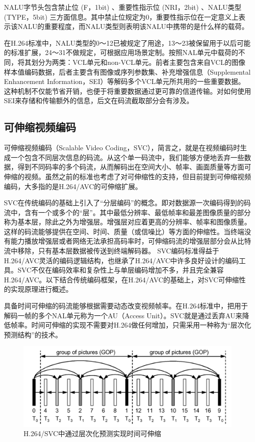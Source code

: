 NALU字节头包含禁止位 (F，1bit) 、重要性指示位 (NRI，2bit) 、NALU类型 (TYPE，5bit) 三方面信息。其中禁止位规定为0，重要性指示位在一定意义上表示该NALU的重要程度，而NALU类型则表明该NALU中携带的是什么样的载荷。

在H.264标准中，NALU类型的0～12已被规定了用途，13～23被保留用于以后可能的标准扩展，24～31不做规定，可根据应用场景定制。按照NAL单元中载荷的不同，将其划分为两类：VCL单元和non-VCL单元。前者主要包含来自VCL的图像样本值编码数据，后者主要含有图像或序列参数集、补充增强信息（Supplemental Enhancement Information，SEI）等解码多个VCL单元所共用的一些重要数据。这种机制不仅能节省开销，也便于将重要数据通过更可靠的信道传输。对如何使用SEI来存储和传输额外的信息，后文在码流截取部分会有涉及。

\subsection{可伸缩视频编码}

可伸缩视频编码（Scalable Video Coding，SVC），简言之，就是在视频编码时生成一个包含不同层次信息的码流。从这个单一码流中，我们能够方便地丢弃一些数据，得到不同码率的多个码流，从而解码出在空间大小、帧率、画面质量等方面可伸缩的视频。虽然之前的标准也考虑了对可伸缩性的支持，但目前提到可伸缩视频编码，大多指的是H.264/AVC的可伸缩扩展。

SVC在传统编码的基础上引入了“分层编码”的概念。即对数据源一次编码得到的码流中，含有一个或多个的“层”。其中最低分辨率、最低帧率和最差图像质量的部分称为基本层，除此之外为增强层。增强层对应着更高的分辨率、帧率和图像质量。这样的码流能够提供在空间、时间、质量（或信噪比）等方面的伸缩性。当终端没有能力播放增强层或者网络无法承担高码率时，可伸缩码流的增强层部分会从比特流中移除，只有基本层数据被传送到终端解码器。
SVC编码标准得益于H.264/AVC灵活的编码逻辑结构，也继承了H.264/AVC中许多良好设计的编码工具。SVC不仅在编码效率和复杂性上与单层编码增加不多\supercite{SVC-Performance}，并且完全兼容H.264/AVC。以下结合传统编码框架，在H.264/AVC的基础上，对SVC可伸缩性的实现原理进行概述。

具备时间可伸缩的码流能够根据需要动态改变视频帧率。在H.264标准中，把用于解码一帧的多个NAL单元称为一个AU（Access Unit）。SVC就是通过丢弃AU来降低帧率。时间可伸缩的实现不需要对H.264做任何增加，只需采用一种称为“层次化预测结构”的技术。

\begin{figure}[h]
	\centering
	\includegraphics[width = 1.0\linewidth]{clip/04.png}
	\caption{H.264/SVC中通过层次化预测实现时间可伸缩\label{fig:04}}
\end{figure}

